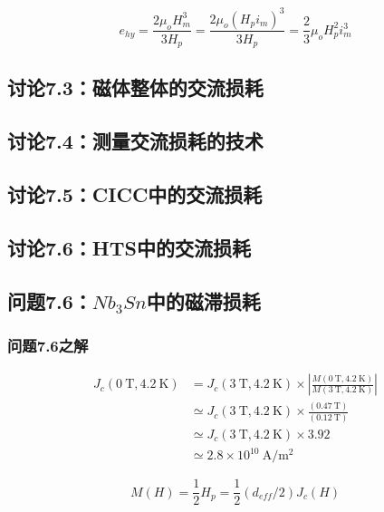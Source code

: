 \begin{equation}%
e_{hy}=\frac{2\mu_oH_{m}^{3}}{3H_p} 
=\frac{2\mu_o(H_pi_m)^3}{3H_p} 
=\frac{2}{3}\mu_oH_{p}^{2}i_{m}^{3}
\end{equation}


\subsection{讨论7.3：磁体整体的交流损耗}


\subsection{讨论7.4：测量交流损耗的技术}




\subsection{讨论7.5：CICC中的交流损耗}



\subsection{讨论7.6：HTS中的交流损耗}




\subsection{问题7.6：$Nb_3Sn$中的磁滞损耗}


\subsubsection{问题7.6之解}
\begin{align*}%
J_c(0\ \mathrm{T},4.2\ \mathrm{K})&=J_c(3\ \mathrm{T},4.2\ \mathrm{K})\times\left| \frac{M(0\ \mathrm{T},4.2\ \mathrm{K})}{M(3\ \mathrm{T},4.2\ \mathrm{K})}\right| \\ 
&\simeq J_c(3\ \mathrm{T},4.2\ \mathrm{K})\times\frac{(0.47\ \mathrm{T})}{(0.12\ \mathrm{T})}\\
&\simeq J_c(3\ \mathrm{T},4.2\ \mathrm{K})\times 3.92 \\
&\simeq 2.8\times 10^{10}\ \mathrm{A/m^2}
\end{align*}


\begin{equation}%
M(H)=\frac{1}{2}H_p=\frac{1}{2}(d_{eff}/2)J_c(H)
\end{equation}

